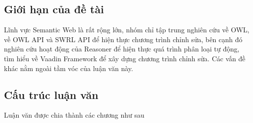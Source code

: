 \subsection{Giới hạn của đề tài}
Lĩnh vực Semantic Web là rất rộng lớn, nhóm chỉ tập trung nghiên cứu về OWL, về OWL API \cite{owlapi} và SWRL API \cite{swrlapi} để hiện thực chương trình chỉnh sửa, bên cạnh đó nghiên cứu hoạt động của Reasoner để hiện thực quá trình phân loại tự động, tìm hiểu về Vaadin Framework để xây dựng chương trình chỉnh sửa. Các vấn đề khác nằm ngoài tầm vóc của luận văn này.
\\
\subsection{Cấu trúc luận văn}
Luận văn được chia thành các chương như sau